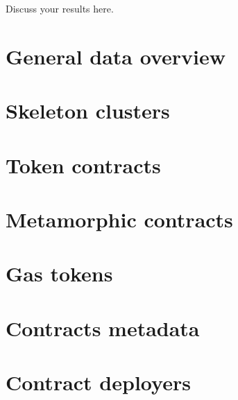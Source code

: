 
Discuss your results here.

\section{General data overview}

\section{Skeleton clusters}

\section{Token contracts}

\section{Metamorphic contracts}

\section{Gas tokens}

\section{Contracts metadata}

\section{Contract deployers}

